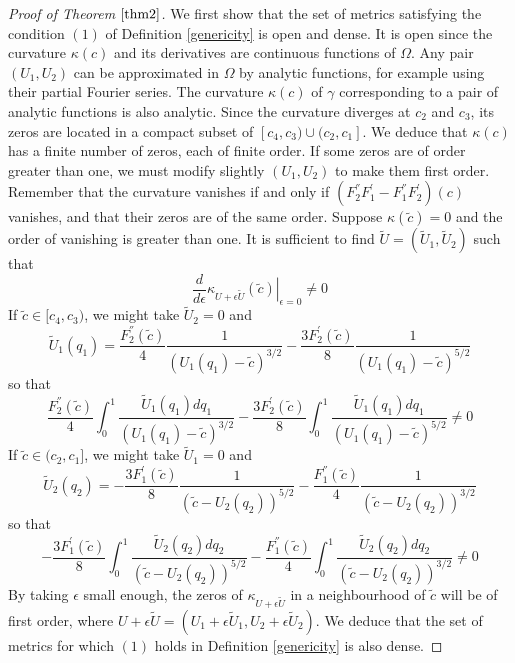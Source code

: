 \documentclass[12pt]{amsart}
\numberwithin{equation}{subsection}
\theoremstyle{definition}
\theoremstyle{plain}
\begin{document}
\begin{proof}[Proof of Theorem $\ref{thm2}$]
We first show that the set of metrics satisfying the condition $(1)$ of Definition \ref{genericity} is open and dense.
It is open since the curvature $\kappa(c)$ and its derivatives are continuous functions of $\Omega$.
Any pair $(U_1,U_2)$ can be approximated in $\Omega$ by analytic functions, for example using their partial Fourier series.
The curvature $\kappa(c)$ of $\gamma$ corresponding to a pair of analytic functions is also analytic.
Since the curvature diverges at $c_2$ and $c_3$, its zeros are located in a compact subset of
$[c_4,c_3) \cup (c_2,c_1]$.
We deduce that $\kappa(c)$ has  a finite number of zeros, each of finite order. If some zeros are of order greater than one, we must modify slightly $(U_1,U_2)$ to
make them first order.
Remember that the curvature vanishes if and only if $(F_2^{''}F_1^{'} - F_1^{''}F_2^{'})(c)$ vanishes,
and that their zeros are of the same order.
Suppose $\kappa(\tilde{c})=0$ and the order of vanishing is greater than one.
It is sufficient to find $\tilde{U}=(\tilde{U}_1,\tilde{U}_2)$ such that
\[
\frac{d}{d \epsilon} \left. \kappa_{U+ \epsilon \tilde{U}}(\tilde{c}) \right|_{\epsilon=0}  \neq 0
\]
If $\tilde{c} \in [c_4,c_3)$, we might take $\tilde{U}_2 = 0$
and
\[
\tilde{U}_1 (q_1) =
\frac{F_2^{''}(\tilde{c})}{4}   \frac{1}{(U_1(q_1)-\tilde{c})^{3/2}} -
\frac{3 F_2^{'}(\tilde{c})}{8}  \frac{1}{(U_1(q_1)-\tilde{c})^{5/2}}
\]
so that
\[
\frac{F_2^{''}(\tilde{c})}{4}   \int_{0}^{1} \frac{\tilde{U}_1(q_1) dq_1}{(U_1(q_1)-\tilde{c})^{3/2}} -
\frac{3 F_2^{'}(\tilde{c})}{8}   \int_{0}^{1} \frac{\tilde{U}_1(q_1) dq_1}{(U_1(q_1)-\tilde{c})^{5/2}}
\neq 0
\]
If $\tilde{c} \in (c_2,c_1]$, we might take $\tilde{U}_1 = 0$
and
\[
\tilde{U}_2 (q_2)=
-\frac{3 F_1^{'}(\tilde{c})}{8}       \frac{1}{(\tilde{c} - U_2(q_2))^{5/2}} -
\frac{F_1^{''}(\tilde{c})}{4}        \frac{1}{(\tilde{c} - U_2(q_2))^{3/2}}
\]
so that
\[
-\frac{3 F_1^{'}(\tilde{c})}{8}       \int_{0}^{1} \frac{\tilde{U}_2(q_2) dq_2}{(\tilde{c} - U_2(q_2))^{5/2}} -
\frac{F_1^{''}(\tilde{c})}{4}       \int_{0}^{1} \frac{\tilde{U}_2(q_2) dq_2}{(\tilde{c} - U_2(q_2))^{3/2}}
\neq 0
\]
By taking $\epsilon$ small enough, the zeros of $\kappa_{U+ \epsilon \tilde{U}}$ in a neighbourhood
of $\tilde{c}$ will be of first order, where $U + \epsilon \tilde{U} = (U_1 + \epsilon \tilde{U}_1 , U_2 + \epsilon \tilde{U}_2)$.
We deduce that the set of metrics for which $(1)$ holds in Definition \ref{genericity} is also dense.


\end{proof}
\end{document}
